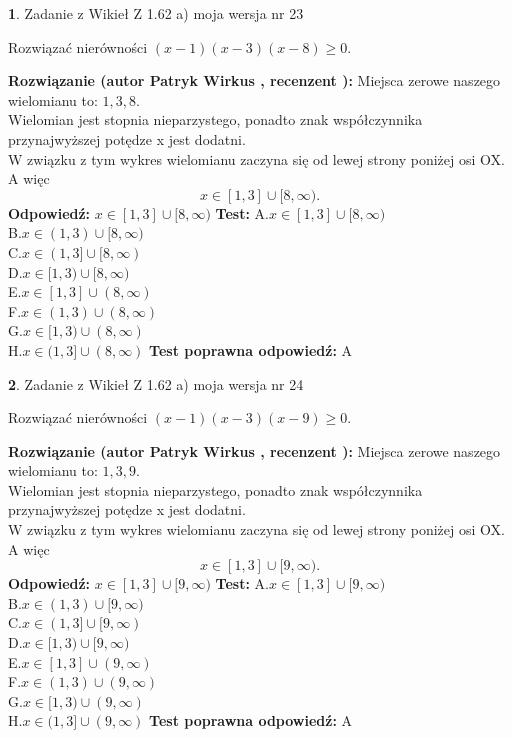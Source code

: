\documentclass[12pt, a4paper]{article}
\theoremstyle{definition} %
\newtheorem{zad}{}
\newcommand{\zadStart}[1]{\begin{zad}#1\newline}
\newcommand{\zadStop}{\end{zad}}
\newcommand{\rozwStart}[2]{\noindent \textbf{Rozwiązanie (autor #1 , recenzent #2): }\newline}
\newcommand{\rozwStop}{\newline}
\newcommand{\odpStart}{\noindent \textbf{Odpowiedź:}\newline}
\newcommand{\odpStop}{\newline}
\newcommand{\testStart}{\noindent \textbf{Test:}\newline}
\newcommand{\testStop}{\newline}
\newcommand{\kluczStart}{\noindent \textbf{Test poprawna odpowiedź:}\newline}
\newcommand{\kluczStop}{\newline}
\begin{document}
\zadStart{Zadanie z Wikieł Z 1.62 a) moja wersja nr 23}

Rozwiązać nierówności $(x-1)(x-3)(x-8)\ge0$.
\zadStop
\rozwStart{Patryk Wirkus}{}
Miejsca zerowe naszego wielomianu to: $1, 3, 8$.\\
Wielomian jest stopnia nieparzystego, ponadto znak współczynnika przy\linebreak najwyższej potędze x jest dodatni.\\ W związku z tym wykres wielomianu zaczyna się od lewej strony poniżej osi OX. A więc $$x \in [1,3] \cup [8,\infty).$$
\rozwStop
\odpStart
$x \in [1,3] \cup [8,\infty)$
\odpStop
\testStart
A.$x \in [1,3] \cup [8,\infty)$\\
B.$x \in (1,3) \cup [8,\infty)$\\
C.$x \in (1,3] \cup [8,\infty)$\\
D.$x \in [1,3) \cup [8,\infty)$\\
E.$x \in [1,3] \cup (8,\infty)$\\
F.$x \in (1,3) \cup (8,\infty)$\\
G.$x \in [1,3) \cup (8,\infty)$\\
H.$x \in (1,3] \cup (8,\infty)$
\testStop
\kluczStart
A
\kluczStop



\zadStart{Zadanie z Wikieł Z 1.62 a) moja wersja nr 24}

Rozwiązać nierówności $(x-1)(x-3)(x-9)\ge0$.
\zadStop
\rozwStart{Patryk Wirkus}{}
Miejsca zerowe naszego wielomianu to: $1, 3, 9$.\\
Wielomian jest stopnia nieparzystego, ponadto znak współczynnika przy\linebreak najwyższej potędze x jest dodatni.\\ W związku z tym wykres wielomianu zaczyna się od lewej strony poniżej osi OX. A więc $$x \in [1,3] \cup [9,\infty).$$
\rozwStop
\odpStart
$x \in [1,3] \cup [9,\infty)$
\odpStop
\testStart
A.$x \in [1,3] \cup [9,\infty)$\\
B.$x \in (1,3) \cup [9,\infty)$\\
C.$x \in (1,3] \cup [9,\infty)$\\
D.$x \in [1,3) \cup [9,\infty)$\\
E.$x \in [1,3] \cup (9,\infty)$\\
F.$x \in (1,3) \cup (9,\infty)$\\
G.$x \in [1,3) \cup (9,\infty)$\\
H.$x \in (1,3] \cup (9,\infty)$
\testStop
\kluczStart
A
\kluczStop
\end{document}
